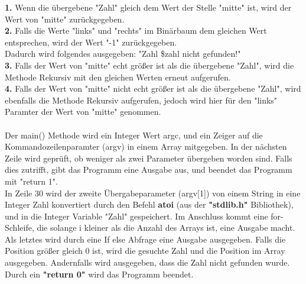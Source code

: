 \documentclass[12pt]{article}
\begin{document}
\textbf{1.} Wenn die übergebene "Zahl" gleich dem Wert der Stelle "mitte" ist, wird der Wert von "mitte"           zurückgegeben.\\

\textbf{2.} Falls die Werte "links" und "rechts" im Binärbaum dem gleichen Wert entsprechen, wird der Wert "-1"     zurückgegeben.\\ Dadurch wird folgendes ausgegeben: "Zahl \$zahl nicht gefunden!" \\

\textbf{3.} Falls der Wert von "mitte" echt größer ist als die übergebene "Zahl", wird die Methode Rekursiv mit     den gleichen Werten erneut aufgerufen.\\

\textbf{4.} Falls der Wert von "mitte" nicht echt größer ist als die übergebene "Zahl", wird ebenfalls die         Methode Rekursiv aufgerufen, jedoch wird hier für den "links" Paramter der Wert von "mitte"           genommen.\\\\
Der main() Methode wird ein Integer Wert argc, und ein Zeiger auf die Kommandozeilenparamter (argv) in einem Array mitgegeben. In der nächsten Zeile wird geprüft, ob weniger als zwei Parameter übergeben worden sind. Falls dies zutrifft, gibt das Programm eine Ausgabe aus, und beendet das Programm mit "return 1".\\
In Zeile 30 wird der zweite Übergabeparameter (argv[1]) von einem String in eine Integer Zahl konvertiert durch den Befehl \textbf{atoi} (aus der \textbf{"stdlib.h"} Bibliothek), und in die Integer Variable "Zahl" gespeichert. Im Anschluss kommt eine for-Schleife, die solange i kleiner als die Anzahl des Arrays ist, eine Ausgabe macht.\\
Als letztes wird durch eine If else Abfrage eine Ausgabe ausgegeben. Falls die Position größer gleich 0 ist, wird die gesuchte Zahl und die Position im Array ausgegeben. Andernfalls wird ausgegeben, dass die Zahl nicht gefunden wurde. Durch ein \textbf{"return 0"} wird das Programm beendet.
\newpage
\end{document}
